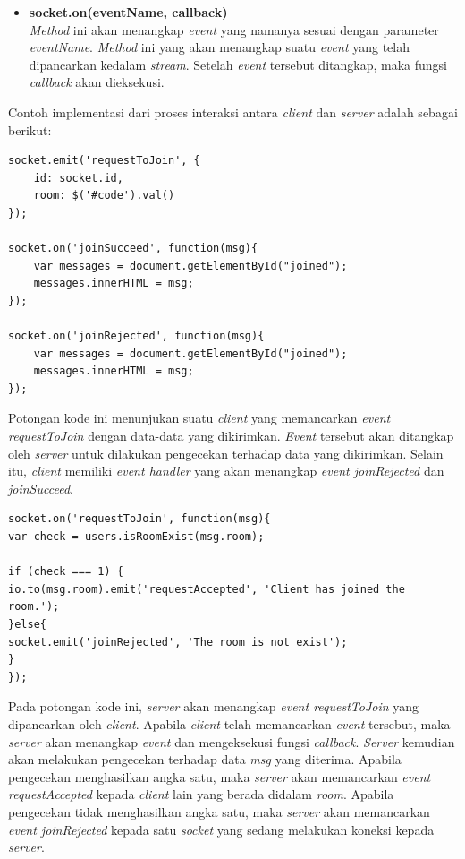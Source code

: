 \begin{enumerate}
\begin{itemize}
		\item \textbf{socket.on(eventName, callback)} \\
		\textit{Method} ini akan menangkap \textit{event} yang namanya sesuai dengan parameter \textit{eventName}. \textit{Method} ini yang akan menangkap suatu \textit{event} yang telah dipancarkan kedalam \textit{stream}. Setelah \textit{event} tersebut ditangkap, maka fungsi \textit{callback} akan dieksekusi.
	\end{itemize}
Contoh implementasi dari proses interaksi antara \textit{client} dan \textit{server} adalah sebagai berikut:
\begin{lstlisting}[caption={potongan kode pada bagian \textit{client}}, label={lst:interaksi_client}, captionpos=b]
socket.emit('requestToJoin', {
	id: socket.id,
	room: $('#code').val()
});

socket.on('joinSucceed', function(msg){
	var messages = document.getElementById("joined");
	messages.innerHTML = msg;
});

socket.on('joinRejected', function(msg){
	var messages = document.getElementById("joined");
	messages.innerHTML = msg;
});
\end{lstlisting}
Potongan kode ini menunjukan suatu \textit{client} yang memancarkan \textit{event requestToJoin} dengan data-data yang dikirimkan. \textit{Event} tersebut akan ditangkap oleh \textit{server} untuk dilakukan pengecekan terhadap data yang dikirimkan. Selain itu, \textit{client} memiliki \textit{event handler} yang akan menangkap \textit{event joinRejected} dan \textit{joinSucceed}.


\begin{lstlisting}[caption={potongan kode pada bagian \textit{server}}, label={lst:interaksi_server}, captionpos=b]
socket.on('requestToJoin', function(msg){
var check = users.isRoomExist(msg.room);

if (check === 1) {
io.to(msg.room).emit('requestAccepted', 'Client has joined the room.');
}else{
socket.emit('joinRejected', 'The room is not exist');
}
});
\end{lstlisting}
Pada potongan kode ini, \textit{server} akan menangkap \textit{event requestToJoin} yang dipancarkan oleh \textit{client}. Apabila \textit{client} telah memancarkan \textit{event} tersebut, maka \textit{server} akan menangkap \textit{event} dan mengeksekusi fungsi \textit{callback}. \textit{Server} kemudian akan melakukan pengecekan terhadap data \textit{msg} yang diterima. Apabila pengecekan menghasilkan angka satu, maka \textit{server} akan memancarkan \textit{event requestAccepted} kepada \textit{client} lain yang berada didalam \textit{room}. Apabila pengecekan tidak menghasilkan angka satu, maka \textit{server} akan memancarkan \textit{event joinRejected} kepada satu \textit{socket} yang sedang melakukan koneksi kepada \textit{server}.


\end{enumerate}
